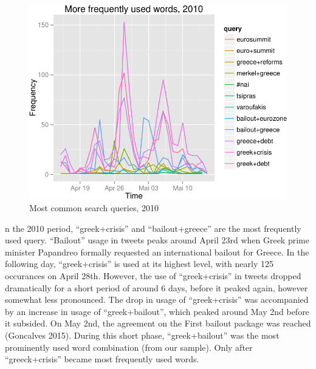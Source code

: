 \documentclass[]{article}
\begin{document}
\begin{figure}

{\centering \includegraphics{fin_paper_files/figure-latex/unnamed-chunk-8-1} 

}

\caption{Most common search queries, 2010}\label{fig:unnamed-chunk-8}
\end{figure}

n the 2010 period, ``greek+crisis'' and ``bailout+greece'' are the most
frequently used query. ``Bailout'' usage in tweets peaks around April
23rd when Greek prime minister Papandreo formally requested an
international bailout for Greece. In the following day, ``greek+crisis''
is used at its highest level, with nearly 125 occurances on April 28th.
However, the use of ``greek+crisis'' in tweets dropped dramatically for
a short period of around 6 days, before it peaked again, however
somewhat less pronounced. The drop in usage of ``greek+crisis'' was
accompanied by an increase in usage of ``greek+bailout'', which peaked
around May 2nd before it subsided. On May 2nd, the agreement on the
First bailout package was reached (Goncalves 2015). During this short
phase, ``greek+bailout'' was the most prominently used word combination
(from our sample). Only after ``greeck+crisis'' became most frequently
used words.
\end{document}
